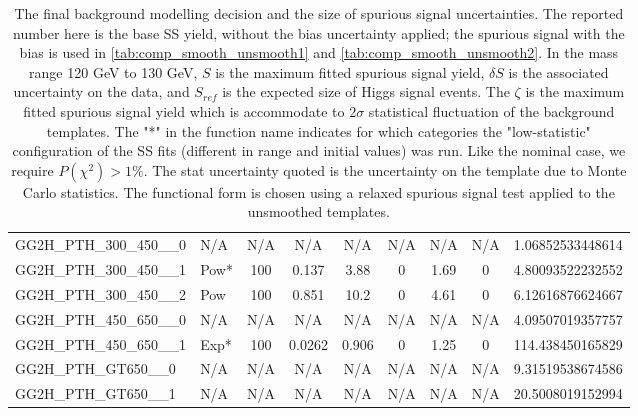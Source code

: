 \begin{table}[!h]
{\begin{tabular}{llccccccS[table-format = 3.2, round-mode = places, round-precision = 2]}
 GG2H\_PTH\_300\_450\_\_0 &N/A&N/A&N/A&N/A&N/A&N/A&N/A&1.06852533448614\\
 GG2H\_PTH\_300\_450\_\_1 &Pow*&100&0.137&3.88&0&1.69&0&4.80093522232552\\
 GG2H\_PTH\_300\_450\_\_2 & Pow &100&0.851&10.2&0&4.61&0&6.12616876624667\\
 GG2H\_PTH\_450\_650\_\_0 &N/A&N/A&N/A&N/A&N/A&N/A&N/A&4.09507019357757\\
 GG2H\_PTH\_450\_650\_\_1 & Exp* &100&0.0262&0.906&0&1.25&0&114.438450165829\\
 GG2H\_PTH\_GT650\_\_0 &N/A&N/A&N/A&N/A&N/A&N/A&N/A&9.31519538674586\\
 GG2H\_PTH\_GT650\_\_1 &N/A&N/A&N/A&N/A&N/A&N/A&N/A&20.5008019152994\\
    \hline
      \hline
      \end{tabular}
}
      \caption{
The final background modelling decision and the size of spurious signal uncertainties. The reported number here is the base SS yield, without the bias uncertainty applied; the spurious signal with the bias is used in \ref{tab:comp_smooth_unsmooth1} and \ref{tab:comp_smooth_unsmooth2}.
   In the mass range 120 GeV to 130 GeV, $S$ is the maximum fitted spurious signal yield, $\delta S$ is the associated uncertainty on the data, and $S_{ref}$ is the expected size of Higgs signal events.
   The $\zeta$ is the maximum fitted spurious signal yield which is accommodate to $2\sigma$ statistical fluctuation of the background templates.
   The "*" in the function name indicates for which categories the "low-statistic" configuration of the SS fits (different in range and initial values) was run. Like the nominal case, we require $P(\chi^2) > 1\%$. The stat uncertainty quoted is the uncertainty on the template due to Monte Carlo statistics. The functional form is chosen using a relaxed spurious signal test applied to the unsmoothed templates.
      \label{tab:spurious_sig_gp} }
\end{table}


